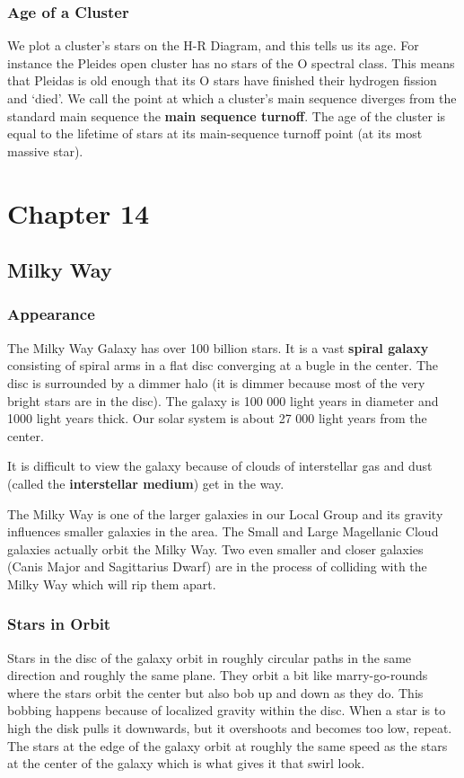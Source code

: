 \documentclass[12pt]{article}
\begin{document}
\subsubsection{Age of a Cluster}
We plot a cluster's stars on the H-R Diagram, and this tells us its age. For instance the Pleides open cluster has no stars of the O spectral class. This means that Pleidas is old enough that its O stars have finished their hydrogen fission and `died'. We call the point at which a cluster's main sequence diverges from the standard main sequence the \textbf{main sequence turnoff}. The age of the cluster is equal to the lifetime of stars at its main-sequence turnoff point (at its most massive star).


\section{Chapter 14}
\subsection{Milky Way}
\subsubsection{Appearance}
The Milky Way Galaxy has over 100 billion stars. It is a vast \textbf{spiral galaxy} consisting of spiral arms in a flat disc converging at a bugle in the center. The disc is surrounded by a dimmer halo (it is dimmer because most of the very bright stars are in the disc). The galaxy is 100 000 light years in diameter and 1000 light years thick. Our solar system is about 27 000 light years from the center.

It is difficult to view the galaxy because of clouds of interstellar gas and dust (called the \textbf{interstellar medium}) get in the way.

The Milky Way is one of the larger galaxies in our Local Group and its gravity influences smaller galaxies in the area. The Small and Large Magellanic Cloud galaxies actually orbit the Milky Way. Two even smaller and closer galaxies (Canis Major and Sagittarius Dwarf) are in the process of colliding with the Milky Way which will rip them apart.

\subsubsection{Stars in Orbit}
Stars in the disc of the galaxy orbit in roughly circular paths in the same direction and roughly the same plane. They orbit a bit like marry-go-rounds where the stars orbit the center but also bob up and down as they do. This bobbing happens because of localized gravity within the disc. When a star is to high the disk pulls it downwards, but it overshoots and becomes too low, repeat. The stars at the edge of the galaxy orbit at roughly the same speed as the stars at the center of the galaxy which is what gives it that swirl look.
\end{document}
